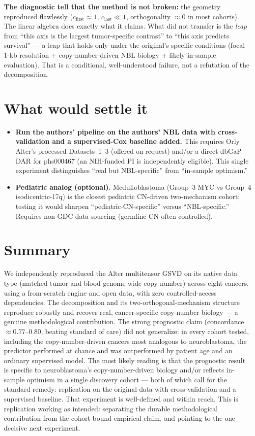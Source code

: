 \documentclass[11pt]{article}
\begin{document}
\textbf{The diagnostic tell that the method is not broken:} the geometry
reproduced flawlessly ($c_{\text{first}}\approx1$, $c_{\text{last}}\ll1$,
orthogonality $\approx0$ in most cohorts). The linear algebra does exactly what it
claims. What did not transfer is the \emph{leap} from ``this axis is the largest
tumor-specific contrast'' to ``this axis predicts survival'' --- a leap that holds
only under the original's specific conditions (focal 1-kb resolution +
copy-number-driven NBL biology + likely in-sample evaluation). That is a
conditional, well-understood failure, not a refutation of the decomposition.

\section{What would settle it}
\begin{itemize}[leftmargin=1.4em]
  \item \textbf{Run the authors' pipeline on the authors' NBL data with
  cross-validation and a supervised-Cox baseline added.} This requires Orly
  Alter's processed Datasets~1--3 (offered on request) and/or a direct dbGaP DAR
  for phs000467 (an NIH-funded PI is independently eligible). This single
  experiment distinguishes ``real but NBL-specific'' from ``in-sample optimism.''
  \item \textbf{Pediatric analog (optional).} Medulloblastoma (Group~3 MYC vs
  Group~4 isodicentric-17q) is the closest pediatric CN-driven two-mechanism
  cohort; testing it would sharpen ``pediatric-CN-specific'' versus
  ``NBL-specific.'' Requires non-GDC data sourcing (germline CN often controlled).
\end{itemize}

\section{Summary}
We independently reproduced the Alter multitensor GSVD on its native data type
(matched tumor and blood genome-wide copy number) across eight cancers, using a
from-scratch engine and open data, with zero controlled-access dependencies. The
decomposition and its two-orthogonal-mechanism structure reproduce robustly and
recover real, cancer-specific copy-number biology --- a genuine methodological
contribution. The strong prognostic claim (concordance $\approx0.77$--$0.80$,
beating standard of care) did not generalize: in every cohort tested, including
the copy-number-driven cancers most analogous to neuroblastoma, the predictor
performed at chance and was outperformed by patient age and an ordinary supervised
model. The most likely reading is that the prognostic result is specific to
neuroblastoma's copy-number-driven biology and/or reflects in-sample optimism in a
single discovery cohort --- both of which call for the standard remedy:
replication on the original data with cross-validation and a supervised baseline.
That experiment is well-defined and within reach. This is replication working as
intended: separating the durable methodological contribution from the
cohort-bound empirical claim, and pointing to the one decisive next experiment.
\end{document}
